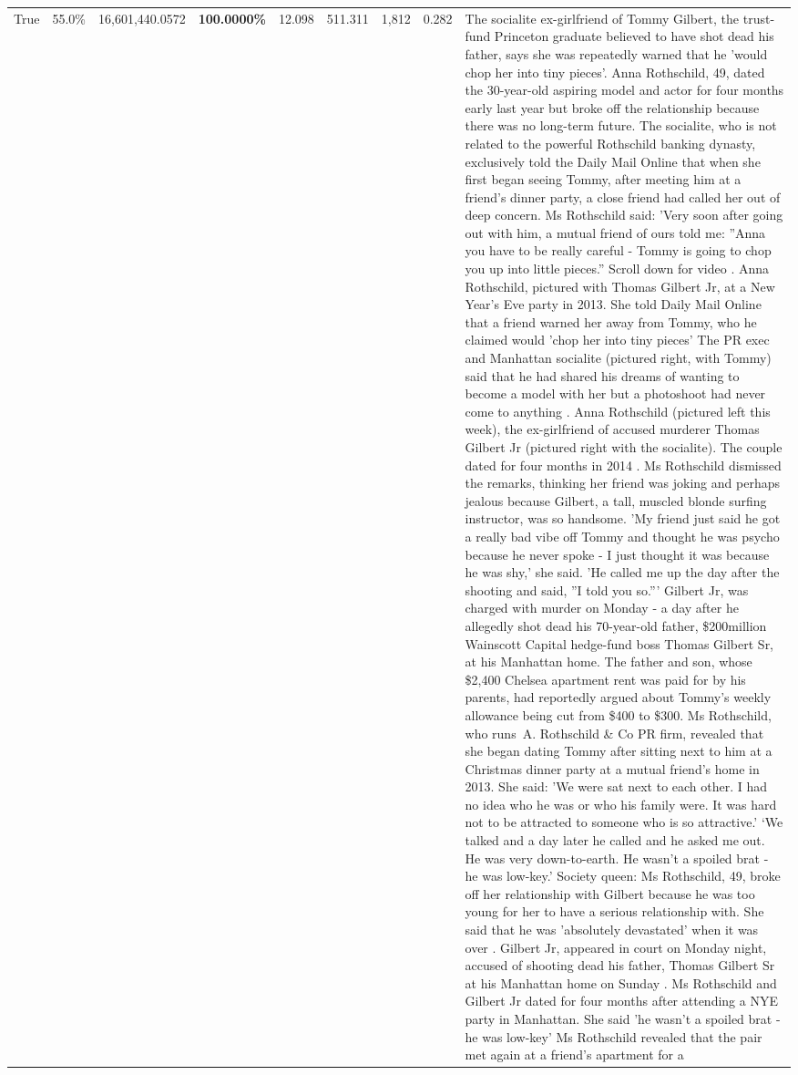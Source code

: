 \begin{table}[H]
\begin{tabular}{lllrlllll}
True & 55.0\% & 16,601,440.0572 & \bfseries \color{red} 100.0000\% & 12.098 & 511.311 & 1,812 & 0.282 & The socialite ex-girlfriend of Tommy Gilbert, the trust-fund Princeton graduate believed to have shot dead his father, says she was repeatedly warned that he 'would chop her into tiny pieces'. Anna Rothschild, 49, dated the 30-year-old aspiring model and actor for four months early last year but broke off the relationship because there was no long-term future. The socialite, who is not related to the powerful Rothschild banking dynasty, exclusively told the Daily Mail Online that when she first began seeing Tommy, after meeting him at a friend's dinner party, a close friend had called her out of deep concern. Ms Rothschild said: 'Very soon after going out with him, a mutual friend of ours told me: ''Anna you have to be really careful - Tommy is going to chop you up into little pieces.'' Scroll down for video . Anna Rothschild, pictured with Thomas Gilbert Jr, at a New Year's Eve party in 2013. She told Daily Mail Online that a friend warned her away from Tommy, who he claimed would 'chop her into tiny pieces' The PR exec and Manhattan socialite (pictured right, with Tommy) said that he had shared his dreams of wanting to become a model with her but a photoshoot had never come to anything . Anna Rothschild (pictured left this week), the ex-girlfriend of accused murderer Thomas Gilbert Jr (pictured right with the socialite). The couple dated for four months in 2014 . Ms Rothschild dismissed the remarks, thinking her friend was joking and perhaps jealous because Gilbert, a tall, muscled blonde surfing instructor, was so handsome. 'My friend just said he got a really bad vibe off Tommy and thought he was psycho because he never spoke - I just thought it was because he was shy,' she said. 'He called me up the day after the shooting and said, ''I told you so.''' Gilbert Jr, was charged with murder on Monday - a day after he allegedly shot dead his 70-year-old father, \$200million Wainscott Capital hedge-fund boss Thomas Gilbert Sr, at his Manhattan home. The father and son, whose \$2,400 Chelsea apartment rent was paid for by his parents, had reportedly argued about Tommy's weekly allowance being cut from \$400 to \$300. Ms Rothschild, who runs A. Rothschild \& Co PR firm, revealed that she began dating Tommy after sitting next to him at a Christmas dinner party at a mutual friend's home in 2013. She said: 'We were sat next to each other. I had no idea who he was or who his family were. It was hard not to be attracted to someone who is so attractive.' ‘We talked and a day later he called and he asked me out. He was very down-to-earth. He wasn’t a spoiled brat - he was low-key.’ Society queen: Ms Rothschild, 49, broke off her relationship with Gilbert because he was too young for her to have a serious relationship with. She said that he was 'absolutely devastated' when it was over . Gilbert Jr, appeared in court on Monday night, accused of shooting dead his father, Thomas Gilbert Sr at his Manhattan home on Sunday . Ms Rothschild and Gilbert Jr dated for four months after attending a NYE party in Manhattan. She said 'he wasn't a spoiled brat - he was low-key' Ms Rothschild revealed that the pair met again at a friend’s apartment for a 
\end{tabular}
\end{table}
